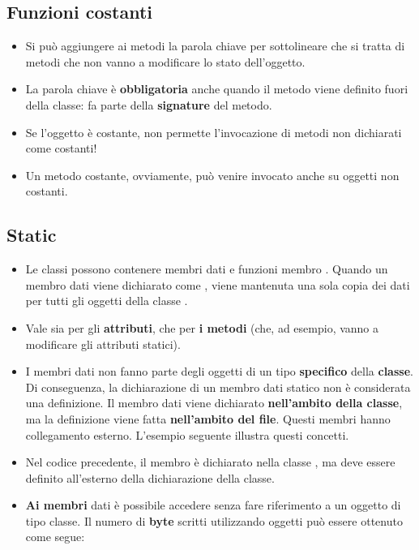 \subsection{Funzioni costanti}
\begin{itemize}
    \item Si può aggiungere ai metodi la parola chiave per
    sottolineare che si tratta di metodi che non vanno a
    modificare lo stato dell’oggetto.
     
    \item La parola chiave  è \textbf{obbligatoria} anche quando il
    metodo viene definito fuori della classe: fa parte della
    \textbf{signature} del metodo.
    \item  Se l’oggetto è costante, non permette l’invocazione di
    metodi non dichiarati come costanti!
    \item  Un metodo costante, ovviamente, può venire invocato
    anche su oggetti non costanti.
\end{itemize}
\subsection{Static}
\begin{itemize}
    \item Le classi possono contenere membri dati \textbf{\textcolor{blue}{}} e funzioni membro \textbf{\textcolor{blue}{}}. Quando un membro dati viene dichiarato come \textbf{\textcolor{blue}{}}, viene mantenuta una sola copia dei dati per tutti gli oggetti della classe .
    
    \item  Vale sia per gli \textbf{attributi}, che per \textbf{i metodi} (che, ad esempio,
    vanno a modificare gli attributi statici).

    \item I membri dati \textbf{\textcolor{blue}{}} non fanno parte degli oggetti di un tipo \textbf{specifico} della \textbf{classe}. Di  conseguenza, la dichiarazione di un membro dati statico non è considerata una definizione. Il membro dati viene dichiarato \textbf{nell'ambito della classe}, ma la definizione viene fatta \textbf{nell'ambito del file}. Questi membri \textbf{\textcolor{blue}{}} hanno collegamento esterno. L'esempio seguente illustra questi concetti.
    \newpage
    
    \item Nel codice precedente, il membro  è dichiarato nella classe , ma deve essere definito all'esterno della dichiarazione della classe.

    \item \textbf{Ai membri} dati \textbf{\textcolor{blue}{}} è possibile accedere senza fare riferimento a un oggetto di tipo classe. Il numero di \textbf{byte} scritti utilizzando oggetti  può essere ottenuto come segue:
    
\end{itemize}
\newpage
